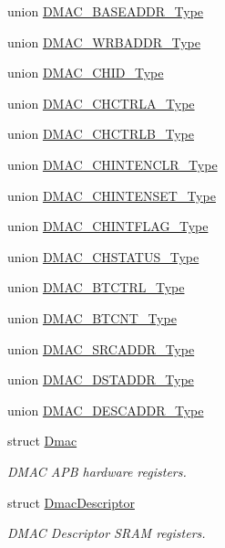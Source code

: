 \begin{DoxyCompactItemize}
\item 
union \hyperlink{union_d_m_a_c___b_a_s_e_a_d_d_r___type}{D\+M\+A\+C\+\_\+\+B\+A\+S\+E\+A\+D\+D\+R\+\_\+\+Type}
\item 
union \hyperlink{union_d_m_a_c___w_r_b_a_d_d_r___type}{D\+M\+A\+C\+\_\+\+W\+R\+B\+A\+D\+D\+R\+\_\+\+Type}
\item 
union \hyperlink{union_d_m_a_c___c_h_i_d___type}{D\+M\+A\+C\+\_\+\+C\+H\+I\+D\+\_\+\+Type}
\item 
union \hyperlink{union_d_m_a_c___c_h_c_t_r_l_a___type}{D\+M\+A\+C\+\_\+\+C\+H\+C\+T\+R\+L\+A\+\_\+\+Type}
\item 
union \hyperlink{union_d_m_a_c___c_h_c_t_r_l_b___type}{D\+M\+A\+C\+\_\+\+C\+H\+C\+T\+R\+L\+B\+\_\+\+Type}
\item 
union \hyperlink{union_d_m_a_c___c_h_i_n_t_e_n_c_l_r___type}{D\+M\+A\+C\+\_\+\+C\+H\+I\+N\+T\+E\+N\+C\+L\+R\+\_\+\+Type}
\item 
union \hyperlink{union_d_m_a_c___c_h_i_n_t_e_n_s_e_t___type}{D\+M\+A\+C\+\_\+\+C\+H\+I\+N\+T\+E\+N\+S\+E\+T\+\_\+\+Type}
\item 
union \hyperlink{union_d_m_a_c___c_h_i_n_t_f_l_a_g___type}{D\+M\+A\+C\+\_\+\+C\+H\+I\+N\+T\+F\+L\+A\+G\+\_\+\+Type}
\item 
union \hyperlink{union_d_m_a_c___c_h_s_t_a_t_u_s___type}{D\+M\+A\+C\+\_\+\+C\+H\+S\+T\+A\+T\+U\+S\+\_\+\+Type}
\item 
union \hyperlink{union_d_m_a_c___b_t_c_t_r_l___type}{D\+M\+A\+C\+\_\+\+B\+T\+C\+T\+R\+L\+\_\+\+Type}
\item 
union \hyperlink{union_d_m_a_c___b_t_c_n_t___type}{D\+M\+A\+C\+\_\+\+B\+T\+C\+N\+T\+\_\+\+Type}
\item 
union \hyperlink{union_d_m_a_c___s_r_c_a_d_d_r___type}{D\+M\+A\+C\+\_\+\+S\+R\+C\+A\+D\+D\+R\+\_\+\+Type}
\item 
union \hyperlink{union_d_m_a_c___d_s_t_a_d_d_r___type}{D\+M\+A\+C\+\_\+\+D\+S\+T\+A\+D\+D\+R\+\_\+\+Type}
\item 
union \hyperlink{union_d_m_a_c___d_e_s_c_a_d_d_r___type}{D\+M\+A\+C\+\_\+\+D\+E\+S\+C\+A\+D\+D\+R\+\_\+\+Type}
\item 
struct \hyperlink{struct_dmac}{Dmac}
\begin{DoxyCompactList}\small\item\em D\+M\+A\+C A\+P\+B hardware registers. \end{DoxyCompactList}\item 
struct \hyperlink{struct_dmac_descriptor}{Dmac\+Descriptor}
\begin{DoxyCompactList}\small\item\em D\+M\+A\+C Descriptor S\+R\+A\+M registers. \end{DoxyCompactList}\end{DoxyCompactItemize}
